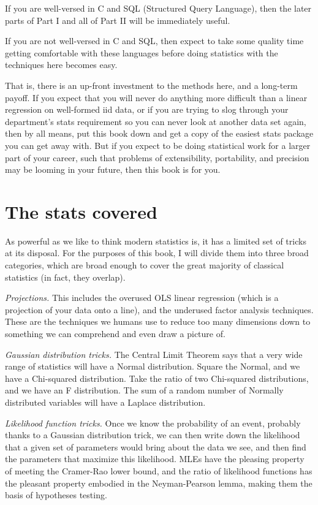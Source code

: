 \documentclass[12pt,notitlepage, openany]{book}
\def\ind#1{\index{#1}#1}
\begin{document}
If you are well-versed in C and SQL (Structured Query Language), then
the later parts of Part I and all of Part II will be immediately useful.

If you are not well-versed in C and SQL, then expect to take some quality
time getting comfortable with these languages before doing statistics
with the techniques here becomes easy.

That is, there is an up-front investment to the methods here, and a
long-term payoff. If you expect that you will never do anything more
difficult than a linear regression on well-formed \ind{iid} data, or
if you are trying to slog through your department's stats requirement
so you can never look at another data set again, then by all means, put
this book down and get a copy of the easiest stats package you can get
away with. But if you expect to be doing statistical work for a larger
part of your career, such that problems of extensibility, portability,
and precision may be looming in your future, then this book is for you.


\section{The stats covered} 
As powerful as we like to think modern statistics is, it has a 
limited set of tricks at its disposal. For the purposes of this book,
I will divide them into three broad categories, which are broad enough
to cover the great majority of classical statistics (in fact, they overlap).

{\it Projections.} This includes the overused OLS linear regression (which is
a projection of your data onto a line), and the underused factor analysis
techniques. These are the techniques we humans use to reduce too many
dimensions down to something we can comprehend and even draw a picture of.

{\it Gaussian distribution tricks.} The Central Limit Theorem says that
a very wide range of statistics will have a Normal distribution. Square
the Normal, and we have a Chi-squared distribution. Take the ratio of two
Chi-squared distributions, and we have an F distribution.  The sum of
a random number of Normally distributed variables will have a Laplace
distribution.

{\it Likelihood function tricks.} Once we know the probability of an
event, probably thanks to a Gaussian distribution trick, we can then
write down the likelihood that a given set of parameters would bring
about the data we see, and then find the parameters that maximize this
likelihood. MLEs have the pleasing property of meeting the Cramer-Rao
lower bound, and the ratio of likelihood functions has the pleasant
property embodied in the Neyman-Pearson lemma, making them the basis of
hypotheses testing.
\end{document}
